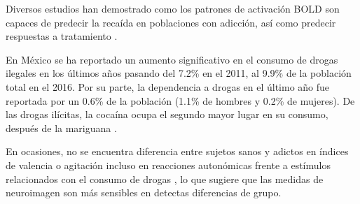 
Diversos estudios han demostrado como los patrones de activación BOLD son capaces de predecir la recaída en poblaciones con adicción, así como predecir respuestas a tratamiento \parencite{Suckling2017}.

En México se ha reportado un aumento significativo en el consumo de drogas ilegales en los últimos años pasando del 7.2\% en el 2011, al 9.9\% de la población total en el 2016.
Por su parte, la dependencia a drogas en el último año fue reportada por un 0.6\% de la población (1.1\% de hombres y 0.2\% de mujeres).
De las drogas ilícitas, la cocaína ocupa el segundo mayor lugar en su consumo, después de la mariguana \parencite{Villatoro-Velazques2017}.

En ocasiones, no se encuentra diferencia entre sujetos sanos y adictos en índices de valencia o agitación \textemdash{}incluso en reacciones autonómicas\textemdash{} frente a estímulos relacionados con el consumo de drogas \parencite{Goldstein2012a}, lo que sugiere que las medidas de neuroimagen son más sensibles en detectas diferencias de grupo.

